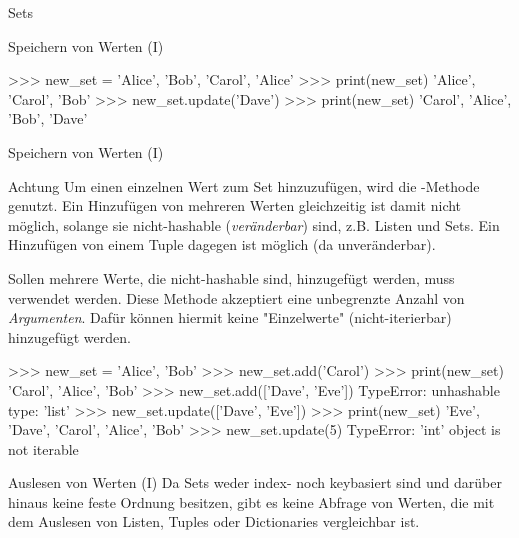 \begin{subsection}{Sets}
\begin{frame}[fragile]{Speichern von Werten (I)}
\begin{itemize}
                    
\begin{pyconcode}
>>> new_set = {'Alice', 'Bob', 'Carol', 'Alice'}
>>> print(new_set)
{'Alice', 'Carol', 'Bob'}
>>> new_set.update({'Dave'})
>>> print(new_set)
{'Carol', 'Alice', 'Bob', 'Dave'}
\end{pyconcode} 
            
                \end{itemize}
            
        \end{frame}
        
        \begin{frame}[fragile]{Speichern von Werten (I)}
            
            \begin{alertblock}{Achtung}
                Um einen einzelnen Wert zum Set hinzuzufügen, wird die -Methode genutzt. Ein Hinzufügen von mehreren Werten gleichzeitig ist damit nicht möglich, solange sie nicht-hashable (\textit{veränderbar}) sind, z.B. Listen und Sets. Ein Hinzufügen von einem Tuple dagegen ist möglich (da unveränderbar).
                
                Sollen mehrere Werte, die nicht-hashable sind, hinzugefügt werden, muss  verwendet werden. Diese Methode akzeptiert eine unbegrenzte Anzahl von \textit{Argumenten}. Dafür können hiermit keine "Einzelwerte" (nicht-iterierbar) hinzugefügt werden.
                
\begin{pyconcode}
>>> new_set = {'Alice', 'Bob'}
>>> new_set.add('Carol')
>>> print(new_set)
{'Carol', 'Alice', 'Bob'}
>>> new_set.add(['Dave', 'Eve'])
TypeError: unhashable type: 'list'
>>> new_set.update(['Dave', 'Eve'])
>>> print(new_set)
{'Eve', 'Dave', 'Carol', 'Alice', 'Bob'}
>>> new_set.update(5)
TypeError: 'int' object is not iterable
\end{pyconcode} 
            \end{alertblock}
        \end{frame}
        
        \begin{frame}[fragile]{Auslesen von Werten (I)}
            Da Sets weder index- noch keybasiert sind und darüber hinaus keine feste Ordnung besitzen, gibt es keine Abfrage von Werten, die mit dem Auslesen von Listen, Tuples oder Dictionaries vergleichbar ist. \\~\
            

\end{frame}
\end{subsection}
